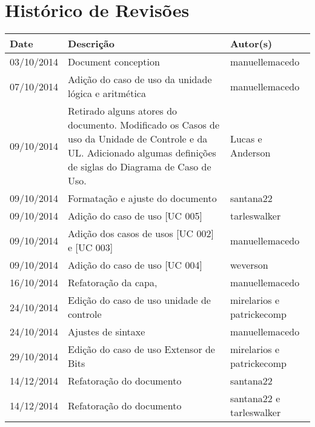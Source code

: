 \documentclass{article}
\begin{document}

\capa
\newpage

\section*{\center Histórico de Revisões}
  \vspace*{1cm}
  \begin{table}[ht]
    \centering
    \begin{tabular}[pos]{|m{2cm} | m{7.2cm} | m{3.8cm}|} 
      \hline
      \cellcolor[gray]{0.9}
      \textbf{Date} & \cellcolor[gray]{0.9}\textbf{Descrição} & \cellcolor[gray]{0.9}\textbf{Autor(s)}\\ \hline
      
      \small 03/10/2014 & \small Document conception &  manuellemacedo \\ \hline      
	
      \small 07/10/2014 & \small Adição do caso de uso da unidade lógica e aritmética &  manuellemacedo \\ \hline
      \small 09/10/2014 & \small Retirado alguns atores do documento. Modificado os Casos de uso da Unidade de Controle e da UL. Adicionado algumas definições de siglas do Diagrama de Caso de Uso. & Lucas e Anderson \\ \hline 
      \small 09/10/2014 & \small Formatação e ajuste do documento & santana22 \\ \hline
      \small 09/10/2014 & \small Adição do caso de uso [UC 005] & tarleswalker \\ \hline
      \small 09/10/2014 & \small Adição dos casos de usos [UC 002] e [UC 003] &  manuellemacedo \\ \hline
       \small 09/10/2014 & \small Adição do caso de uso [UC 004] & weverson \\ \hline
       \small 16/10/2014 & \small Refatoração da capa,  &  manuellemacedo \\ \hline
       \small 24/10/2014 & \small Edição do caso de uso unidade de controle  & \small mirelarios e patrickecomp \\ \hline
       \small 24/10/2014 & \small Ajustes de sintaxe  &  manuellemacedo \\ \hline
       \small 29/10/2014 & \small Edição do caso de uso Extensor de Bits  & \small mirelarios e patrickecomp \\ \hline
       \small 14/12/2014 & \small Refatoração do documento & santana22 \\ \hline
		\small 14/12/2014 & \small Refatoração do 	documento & santana22 e tarleswalker\\ \hline       
    \end{tabular}
  \end{table}
\end{document}
